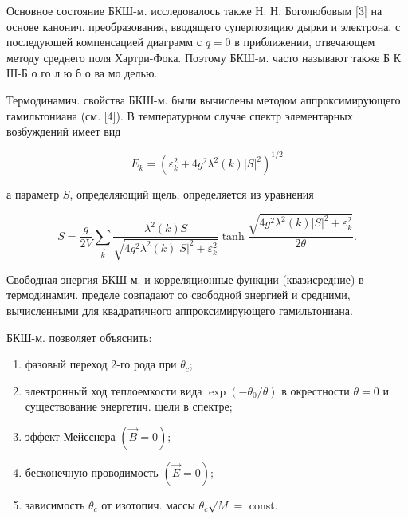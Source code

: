 \documentclass[10pt]{article}
\begin{document}
Основное состояние БКШ-м. исследовалось также Н. Н. Боголюбовым [3] на основе канонич. преобразования, вводящего суперпозицию дырки и электрона, с последующей компенсацией диаграмм с $q=0$ в приближении, отвечающем методу среднего поля Хартри-Фока. Поэтому БКШ-м. часто называют также Б К Ш-Б о го л ю б о ва мо делью.



Термодинамич. свойства БКШ-м. были вычислены методом аппроксимирующего гамильтониана (см. [4]). В температурном случае спектр элементарных возбуждений имеет вид



\[

E_{k}=\left(\varepsilon_{k}^{2}+4 g^{2} \lambda^{2}(k)|S|^{2}\right)^{1 / 2}

\]



а параметр $S$, определяющий щель, определяется из уравнения



\[

S=\frac{g}{2 V} \sum_{\vec{k}} \frac{\lambda^{2}(k) S}{\sqrt{4 g^{2} \lambda^{2}(k)|S|^{2}+\varepsilon_{k}^{2}}} \tanh \frac{\sqrt{4 g^{2} \lambda^{2}(k)|S|^{2}+\varepsilon_{k}^{2}}}{2 \theta} .

\]



Свободная энергия БКШ-м. и корреляционные функции (квазисредние) в термодинамич. пределе совпадают со свободной энергией и средними, вычисленными для квадратичного аппроксимирующего гамильтониана.



БКШ-м. позволяет объяснить:



\begin{enumerate}

  \item фазовый переход 2-го рода при $\theta_{c}$;



  \item электронный ход теплоемкости вида $\exp \left(-\theta_{0} / \theta\right)$ в окрестности $\theta=0$ и существование энергетич. щели в спектре;



  \item эффект Мейсснера $(\vec{B}=0)$;



  \item бесконечную проводимость $(\vec{E}=0)$;



  \item зависимость $\theta_{c}$ от изотопич. массы $\theta_{c} \sqrt{M}=$ const.



\end{enumerate}
\end{document}
